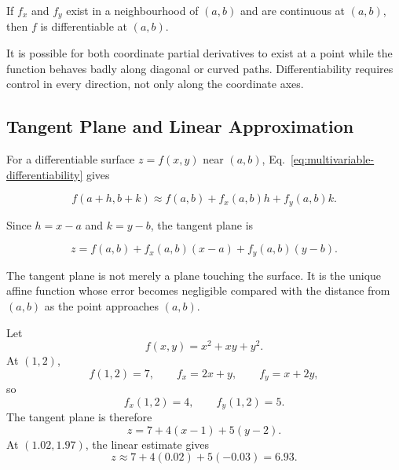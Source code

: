 \begin{bookproperty}
If $f_x$ and $f_y$ exist in a neighbourhood of $(a,b)$ and are continuous at $(a,b)$, then $f$ is differentiable at $(a,b)$.
\end{bookproperty}

\begin{bookwarning}
It is possible for both coordinate partial derivatives to exist at a point while the function behaves badly along diagonal or curved paths. Differentiability requires control in every direction, not only along the coordinate axes.
\end{bookwarning}

\subsection{Tangent Plane and Linear Approximation}

For a differentiable surface $z=f(x,y)$ near $(a,b)$, Eq.~\eqref{eq:multivariable-differentiability} gives

\[
f(a+h,b+k)
\approx
f(a,b)+f_x(a,b)h+f_y(a,b)k.
\]

Since $h=x-a$ and $k=y-b$, the tangent plane is

\begin{equation}
\boxed{
z
=
f(a,b)
+f_x(a,b)(x-a)
+f_y(a,b)(y-b).
}
\label{eq:tangent-plane}
\end{equation}

\begin{bookprinciple}
The tangent plane is not merely a plane touching the surface. It is the unique affine function whose error becomes negligible compared with the distance from $(a,b)$ as the point approaches $(a,b)$.
\end{bookprinciple}

\begin{bookexample}
Let
\[
f(x,y)=x^2+xy+y^2.
\]
At $(1,2)$,
\[
f(1,2)=7,
\qquad
f_x=2x+y,
\qquad
f_y=x+2y,
\]
so
\[
f_x(1,2)=4,
\qquad
f_y(1,2)=5.
\]
The tangent plane is therefore
\[
\boxed{
z=7+4(x-1)+5(y-2).}
\]
At $(1.02,1.97)$, the linear estimate gives
\[
z\approx7+4(0.02)+5(-0.03)=6.93.
\]
\end{bookexample}

